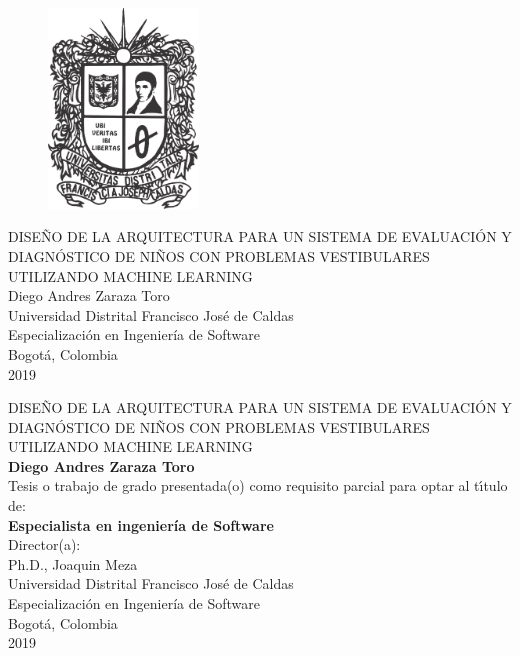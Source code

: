 \documentclass[12pt,letterpaper]{article}
\author{Diego Andres Zaraza Toro}
\begin{document}
    \begin{center}
        \begin{figure}
            \centering
            \includegraphics[width=4cm]{logoUD}
        \end{figure}
        \large{DISEÑO DE LA ARQUITECTURA PARA UN SISTEMA DE EVALUACIÓN Y DIAGNÓSTICO DE NIÑOS CON PROBLEMAS VESTIBULARES UTILIZANDO MACHINE LEARNING}\\[3.5cm]
        \large{Diego Andres Zaraza Toro}\\[3.5cm]
        \large Universidad Distrital Francisco José de Caldas\\
        Especialización en Ingeniería de Software\\
        Bogotá, Colombia\\
        2019\\
    \end{center}
    
    \newpage{\pagestyle{empty}\cleardoublepage}
    
    \newpage
    \begin{center}
        \thispagestyle{empty} \vspace*{0cm} \large{
        DISEÑO DE LA ARQUITECTURA PARA UN SISTEMA DE EVALUACIÓN Y DIAGNÓSTICO DE NIÑOS CON PROBLEMAS VESTIBULARES UTILIZANDO MACHINE LEARNING}\\[3.0cm]
        \Large\textbf{Diego Andres Zaraza Toro}\\[3.0cm]
        \small Tesis o trabajo de grado presentada(o) como requisito parcial para optar al
        t\'{\i}tulo de:\\
        \textbf{Especialista en ingeniería de Software}\\[2.5cm]
        Director(a):\\
        Ph.D., Joaquin Meza\\[2.0cm]
        \large Universidad Distrital Francisco José de Caldas\\
        Especialización en Ingeniería de Software\\
        Bogotá, Colombia\\
        2019\\
    \end{center}
    
    \newpage
    
    \newpage
    \tableofcontents
    \newpage
    \listoffigures
    \newpage
     
\end{document}
